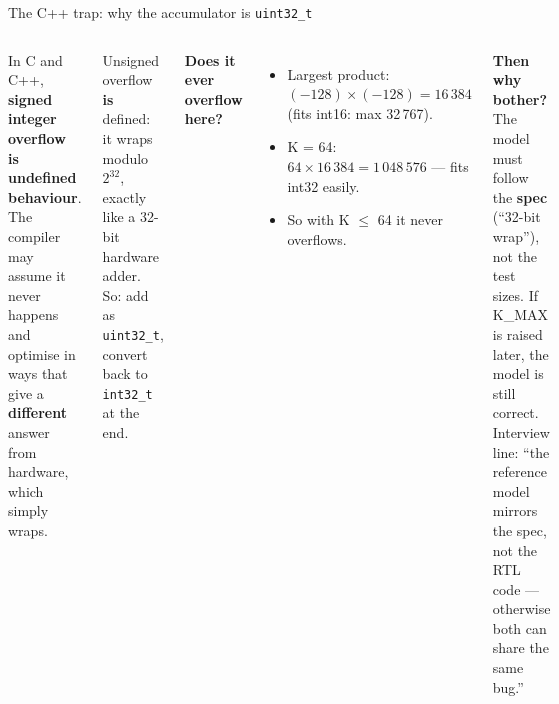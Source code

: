 \documentclass[aspectratio=169,11pt]{beamer}
\newcommand{\sig}[1]{\texttt{#1}}
\begin{document}
\begin{frame}{The C++ trap: why the accumulator is \sig{uint32\_t}}
  \begin{columns}[T]
    \begin{why}
      In C and C++, \textbf{signed integer overflow is undefined behaviour}. The compiler may
      assume it never happens and optimise in ways that give a \textbf{different} answer from
      hardware, which simply wraps.
    \end{why}
    \begin{how}
      Unsigned overflow \textbf{is} defined: it wraps modulo $2^{32}$, exactly like a 32-bit
      hardware adder. So: add as \sig{uint32\_t}, convert back to \sig{int32\_t} at the end.
    \end{how}
    \small
    \textbf{Does it ever overflow here?}
    \begin{itemize}
      \item Largest product: $(-128)\times(-128) = 16\,384$ (fits int16: max 32\,767).
      \item K = 64: $64 \times 16\,384 = 1\,048\,576$ --- fits int32 easily.
      \item So with K $\le$ 64 it never overflows.
    \end{itemize}
    \textbf{Then why bother?} The model must follow the \textbf{spec} (``32-bit wrap''), not the
    test sizes. If K\_MAX is raised later, the model is still correct.\\[2mm]
    \footnotesize\color{muted} Interview line: ``the reference model mirrors the spec, not the RTL code ---
    otherwise both can share the same bug.''
  \end{columns}
\end{frame}
\end{document}
